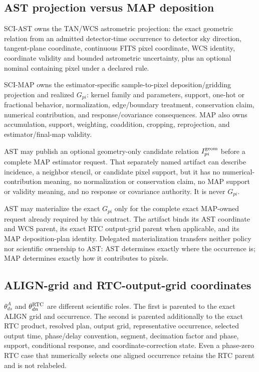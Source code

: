 \subsection{AST projection versus MAP deposition}

SCI-AST owns the TAN/WCS astrometric projection: the exact geometric relation
from an admitted detector-time occurrence to detector sky direction,
tangent-plane coordinate, continuous FITS pixel coordinate, WCS identity,
coordinate validity and bounded astrometric uncertainty, plus an optional
nominal containing pixel under a declared rule.

SCI-MAP owns the estimator-specific sample-to-pixel deposition/gridding
projection and realized $G_{pi}$: kernel family and parameters, support,
one-hot or fractional behavior, normalization, edge/boundary treatment,
conservation claim, numerical contribution, and response/covariance
consequences.  MAP also owns accumulation, support, weighting, coaddition,
cropping, reprojection, and estimator/final-map validity.

AST may publish an optional geometry-only candidate relation
$I^{\rm geom}_{pi}$ before a complete MAP estimator request.  That separately
named artifact can describe incidence, a neighbor stencil, or candidate pixel
support, but it has no numerical-contribution meaning, no normalization or
conservation claim, no MAP support or validity meaning, and no response or
covariance authority.  It is never $G_{pi}$.

AST may materialize the exact $G_{pi}$ only for the complete exact MAP-owned
request already required by this contract.  The artifact binds its AST
coordinate and WCS parent, its exact RTC output-grid parent when applicable,
and its MAP deposition-plan identity.  Delegated materialization transfers
neither policy nor scientific ownership to AST: AST determines exactly where
the occurrence is; MAP determines exactly how it contributes to pixels.

\subsection{ALIGN-grid and RTC-output-grid coordinates}

$\theta^A_{ds}$ and $\theta^{\rm RTC}_{dn}$ are different scientific roles.
The first is parented to the exact ALIGN grid and occurrence.  The second is
parented additionally to the exact RTC product, resolved plan, output grid,
representative occurrence, selected output time, phase/delay convention,
segment, decimation factor and phase, support, conditional response, and
coordinate-correction state.  Even a phase-zero RTC case that numerically
selects one aligned occurrence retains the RTC parent and is not relabeled.

